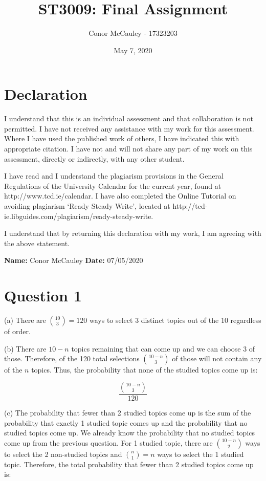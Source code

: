 \documentclass[10pt]{article}
\title{\vspace{-5ex}ST3009: Final Assignment\vspace{-2.5ex}}
\author{Conor McCauley - 17323203}
\date{\vspace{-2ex}May 7, 2020\vspace{-2ex}}
\begin{document}
\maketitle

\section*{Declaration}

I understand that this is an individual assessment and that collaboration is not permitted. I have not received any assistance with my work for this assessment. Where I have used the published work of others, I have indicated this with appropriate citation. I have not and will not share any part of my work on this assessment, directly or indirectly, with any other student.

I have read and I understand the plagiarism provisions in the General Regulations of the University Calendar for the current year, found at http://www.tcd.ie/calendar. I have also completed the Online Tutorial on avoiding plagiarism `Ready Steady Write', located at http://tcd-ie.libguides.com/plagiarism/ready-steady-write.

I understand that by returning this declaration with my work, I am agreeing with the above statement.

\indent \textbf{Name:} Conor McCauley \indent \textbf{Date:} 07/05/2020

\section*{Question 1}

\noindent (a) There are ${10 \choose 3} = 120$ ways to select 3 distinct topics out of the 10 regardless of order.

\noindent (b) There are $10 - n$ topics remaining that can come up and we can choose 3 of those. Therefore, of the 120 total selections ${10 - n \choose 3}$ of those will not contain any of the $n$ topics. Thus, the probability that none of the studied topics come up is:

$$\frac{{10 - n \choose 3}}{120}$$

\noindent (c) The probability that fewer than 2 studied topics come up is the sum of the probability that exactly 1 studied topic comes up and the probability that no studied topics come up. We already know the probability that no studied topics come up from the previous question. For 1 studied topic, there are ${10 - n \choose 2}$ ways to select the 2 non-studied topics and ${n \choose 1} = n$ ways to select the 1 studied topic. Therefore, the total probability that fewer than 2 studied topics come up is:
\end{document}
